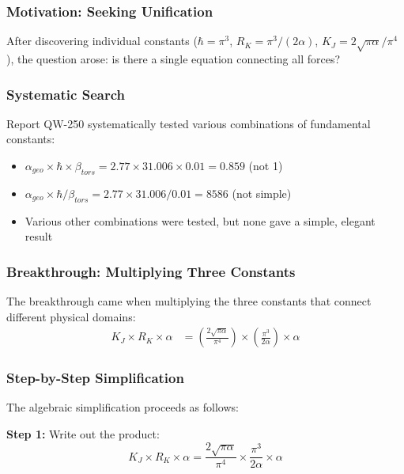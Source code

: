 \documentclass[11pt, a4paper]{article}
\begin{document}
\subsubsection{Motivation: Seeking Unification}

After discovering individual constants ($\hbar = \pi^3$, $R_K = \pi^3/(2\alpha)$, $K_J = 2\sqrt{\pi\alpha}/\pi^4$), the question arose: is there a single equation connecting all forces?

\subsubsection{Systematic Search}

Report QW-250 systematically tested various combinations of fundamental constants:
\begin{itemize}
    \item $\alpha_{geo} \times \hbar \times \beta_{tors} = 2.77 \times 31.006 \times 0.01 = 0.859$ (not 1)
    \item $\alpha_{geo} \times \hbar / \beta_{tors} = 2.77 \times 31.006 / 0.01 = 8586$ (not simple)
    \item Various other combinations were tested, but none gave a simple, elegant result
\end{itemize}

\subsubsection{Breakthrough: Multiplying Three Constants}

The breakthrough came when multiplying the three constants that connect different physical domains:
\begin{align}
K_J \times R_K \times \alpha &= \left(\frac{2\sqrt{\pi\alpha}}{\pi^4}\right) \times \left(\frac{\pi^3}{2\alpha}\right) \times \alpha
\end{align}

\subsubsection{Step-by-Step Simplification}

The algebraic simplification proceeds as follows:

\textbf{Step 1:} Write out the product:
\begin{equation}
K_J \times R_K \times \alpha = \frac{2\sqrt{\pi\alpha}}{\pi^4} \times \frac{\pi^3}{2\alpha} \times \alpha
\end{equation}
\end{document}
